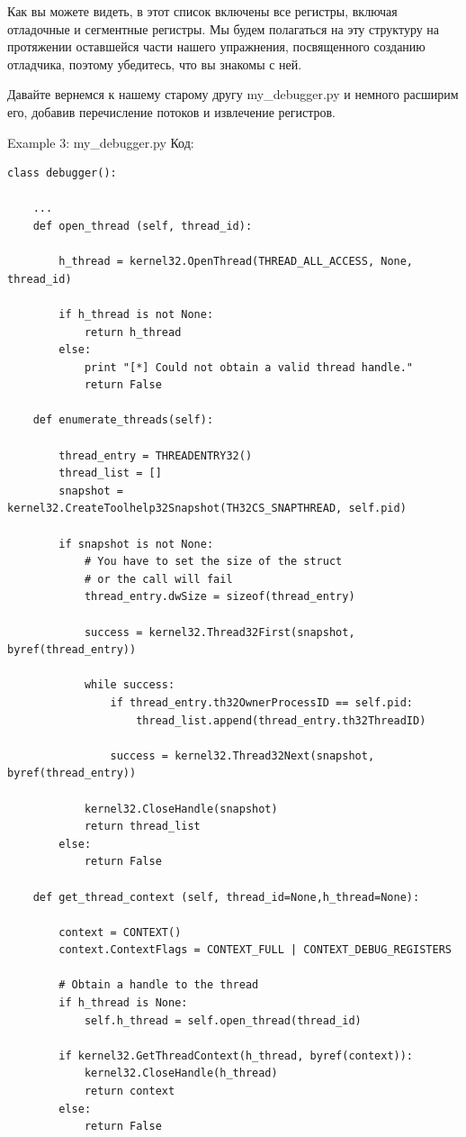 \documentclass[12pt, a4paper, oneside]{book}
\begin{document}
Как вы можете видеть, в этот список включены все регистры, включая отладочные и сегментные регистры. Мы будем полагаться на эту структуру на протяжении оставшейся части нашего упражнения, посвященного созданию отладчика, поэтому убедитесь, что вы знакомы с ней.

Давайте вернемся к нашему старому другу my\_debugger.py и немного расширим его, добавив перечисление потоков и извлечение регистров.

Example 3: my\_debugger.py
Код:
\begin{verbatim}
class debugger():

    ...
    def open_thread (self, thread_id):

        h_thread = kernel32.OpenThread(THREAD_ALL_ACCESS, None, thread_id)

        if h_thread is not None:
            return h_thread
        else:
            print "[*] Could not obtain a valid thread handle."
            return False

    def enumerate_threads(self):

        thread_entry = THREADENTRY32()
        thread_list = []
        snapshot = kernel32.CreateToolhelp32Snapshot(TH32CS_SNAPTHREAD, self.pid)

        if snapshot is not None:
            # You have to set the size of the struct
            # or the call will fail
            thread_entry.dwSize = sizeof(thread_entry)

            success = kernel32.Thread32First(snapshot, byref(thread_entry))

            while success:
                if thread_entry.th32OwnerProcessID == self.pid:
                    thread_list.append(thread_entry.th32ThreadID)

                success = kernel32.Thread32Next(snapshot, byref(thread_entry))

            kernel32.CloseHandle(snapshot)
            return thread_list
        else:
            return False

    def get_thread_context (self, thread_id=None,h_thread=None):

        context = CONTEXT()
        context.ContextFlags = CONTEXT_FULL | CONTEXT_DEBUG_REGISTERS

        # Obtain a handle to the thread
        if h_thread is None:
            self.h_thread = self.open_thread(thread_id) 

        if kernel32.GetThreadContext(h_thread, byref(context)):
            kernel32.CloseHandle(h_thread)
            return context
        else:
            return False
\end{verbatim}
\end{document}
